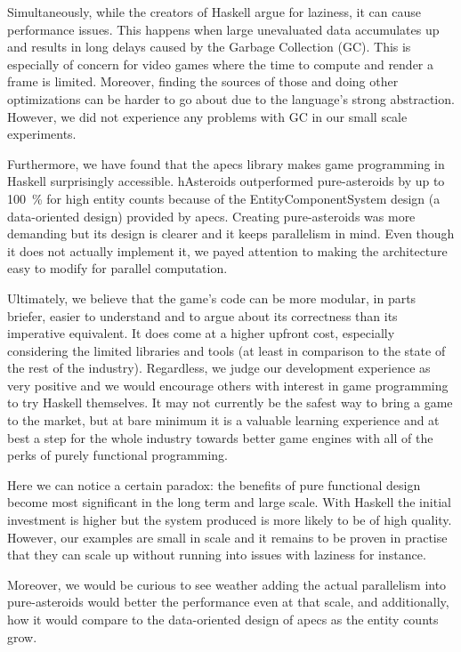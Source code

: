 \documentclass[
  digital, %
  color,   %
  table,   %
  oneside, %
  lof,     %
  lot,     %
]{fithesis3}
\begin{document}
{Simultaneously, while the creators of Haskell argue for laziness, it can cause performance issues.
This happens when large unevaluated data accumulates up and results in long delays caused
by the Garbage Collection (GC). This is especially of concern for video games where the time to
compute and render a frame is limited. Moreover, finding the sources of those 
and doing other optimizations can be harder to go about due to the language's strong abstraction.
However, we did not experience any problems with GC in our small scale experiments.

Furthermore, we have found that the apecs library makes game programming in Haskell surprisingly
accessible. hAsteroids outperformed pure-asteroids by up to 100~\% for high entity counts
because of the Entity\textendash{}Component\textendash{}System design (a data-oriented design)
provided by apecs.
Creating pure-asteroids was more demanding but its design is clearer and it keeps
parallelism in mind. Even though it does not actually implement it, we payed attention
to making the architecture easy to modify for parallel computation.

Ultimately, we believe that the game's code can be more modular, in parts briefer,
easier to understand and to argue about its correctness than its imperative equivalent.
It does come at a higher upfront cost, especially considering the limited libraries and tools
(at least in comparison to the state of the rest of the industry).
Regardless, we judge our development experience as very positive and we would encourage others
with interest in game programming to try Haskell themselves.
It may not currently be the safest way to bring a game to the market,
but at bare minimum it is a valuable learning experience and at best a step for the whole industry
towards better game engines with all of the perks of purely functional programming.

Here we can notice a certain paradox: the benefits of pure functional design
become most significant in the long term and large scale.
With Haskell the initial investment is higher
but the system produced is more likely to be of high quality. However, our examples
are small in scale and it remains to be proven in practise that they can scale up
without running into issues with laziness for instance.

Moreover, we would be curious to see weather adding the actual parallelism into pure-asteroids
would better the performance even at that scale, and additionally,
how it would compare to the data-oriented design of apecs as the entity counts grow.




}
\end{document}
